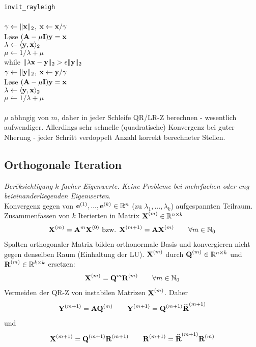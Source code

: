 \verb!invit_rayleigh!\\
{\addtolength{\leftskip}{0mm}
\hrulefill\\
$\gamma \leftarrow \Vert \mbox{\bf x} \Vert_2$, $\mbox{\bf x} \leftarrow \mbox{\bf x}/\gamma$ \\
L\o se $(\mbox{\bf A}-\mu \mbox{\bf I})\mbox{\bf y} = \mbox{\bf x}$\\
$\lambda \leftarrow \langle \mbox{\bf y},\mbox{\bf x} \rangle_2$\\
$\mu \leftarrow 1/\lambda + \mu$ \\
while $\Vert \lambda\mbox{\bf x} - \mbox{\bf y} \Vert_2 > \epsilon \Vert \mbox{\bf y} \Vert_2$ \\ 
\quad $\gamma \leftarrow \Vert \mbox{\bf y} \Vert_2$, $\mbox{\bf x} \leftarrow \mbox{\bf y}/\gamma$ \\
\quad L\o se $(\mbox{\bf A}-\mu \mbox{\bf I})\mbox{\bf y} = \mbox{\bf x}$\\
\quad $\lambda \leftarrow \langle \mbox{\bf y},\mbox{\bf x} \rangle_2$\\
\quad $\mu \leftarrow 1/\lambda + \mu$ \\
\hrulefill\\
}
$\mu$ abh\a ngig von $m$, daher in jeder Schleife QR/LR-Z berechnen - wesentlich aufwendiger. Allerdings sehr schnelle (quadratische) Konvergenz bei guter N\a herung - jeder Schritt verdoppelt Anzahl korrekt berechneter Stellen.

\subsection{Orthogonale Iteration}
\emph{Ber\u cksichtigung $k$-facher Eigenwerte. Keine Probleme bei mehrfachen oder eng beieinanderliegenden Eigenwerten}.\\

Konvergenz gegen von $\mbox{\bf e}^{(1)}, ..., \mbox{\bf e}^{(k)} \in \mathbb{R}^{n}$ (zu $\lambda_1,...,\lambda_k$) aufgespannten Teilraum. Zusammenfassen von $k$ Iterierten in Matrix $\mbox{\bf X}^{(m)}\in \mathbb{R}^{n \times k}$
\begin{align*}
\mbox{\bf X}^{(m)} = \mbox{\bf A}^m \mbox{\bf X}^{(0)} \text{ bzw. } \mbox{\bf X}^{(m+1)} = \mbox{\bf A} \mbox{\bf X}^{(m)}  \qquad \forall m\in \mathbb{N}_0
\end{align*}
Spalten orthogonaler Matrix bilden orthonormale Basis und konvergieren nicht gegen denselben Raum (Einhaltung der LU). $\mbox{\bf X}^{(m)}$ durch $\mbox{\bf Q}^{(m)} \in \mathbb{R}^{n \times k}$ und $\mbox{\bf R}^{(m)} \in \mathbb{R}^{k \times k}$ ersetzen: 
\begin{align*}
\mbox{\bf X}^{(m)} = \mbox{\bf Q}^m \mbox{\bf R}^{(m)} \qquad \forall m\in \mathbb{N}_0
\end{align*}
Vermeiden der QR-Z von instabilen Matrizen $\mbox{\bf X}^{(m)}$. Daher
\begin{align*}
\mbox{\bf Y}^{(m+1)} =\mbox{\bf AQ}^{(m)} \qquad \mbox{\bf Y}^{(m+1)}= \mbox{\bf Q}^{(m+1)}\widehat{\mbox{\bf R}}^{(m+1)}
\end{align*}
und 
\begin{align*}
\mbox{\bf X}^{(m+1)} = \mbox{\bf Q}^{(m+1)} \mbox{\bf R}^{(m+1)} \qquad \mbox{\bf R}^{(m+1)} = \widehat{\mbox{\bf R}}^{(m+1)}\mbox{\bf R}^{(m)}
\end{align*}

